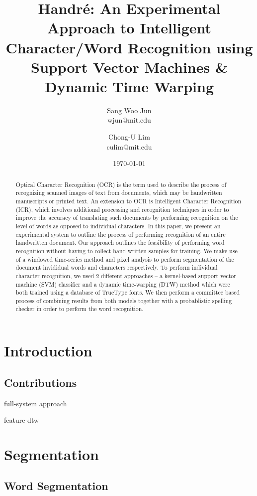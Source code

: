 \documentclass[12pt]{article}
\title{Handr\'{e}: An Experimental Approach to Intelligent Character/Word Recognition using Support Vector Machines \& Dynamic Time Warping}
\date{\today}
\author{
	Sang Woo Jun \\ 
	wjun@mit.edu \\ 
  \and
  Chong-U Lim\\
  culim@mit.edu
}
\begin{document}
\maketitle

\begin{abstract}
	Optical Character Recognition (OCR) is the term used to describe the process of recognizing scanned images of text from documents, which may be handwritten manuscripts or printed text. An extension to OCR is Intelligent Character Recognition (ICR), which involves additional processing and recognition techniques in order to improve the accuracy of translating such documents by performing recognition on the level of words as opposed to individual characters. In this paper, we present an experimental system to outline the process of performing recognition of an entire handwritten document. Our approach outlines the feasibility of performing word recognition without having to collect hand-written samples for training. We make use of a windowed time-series method and pixel analysis to perform segmentation of the document invididual words and characters respectively. To perform individual character recognition, we used 2 different approaches -- a kernel-based support vector machine (SVM) classifier and a dynamic time-warping (DTW) method which were both trained using a database of TrueType fonts. We then perform a committee based process of combining results from both models together with a probablistic spelling checker in order to perform the word recognition. 
\end{abstract}

\newpage
\tableofcontents
\newpage
\section{Introduction}


\subsection{Contributions}
	full-system approach
	
	feature-dtw


\section{Segmentation}
\label{section:segmentation}
	\subsection{Word Segmentation}
\end{document}
